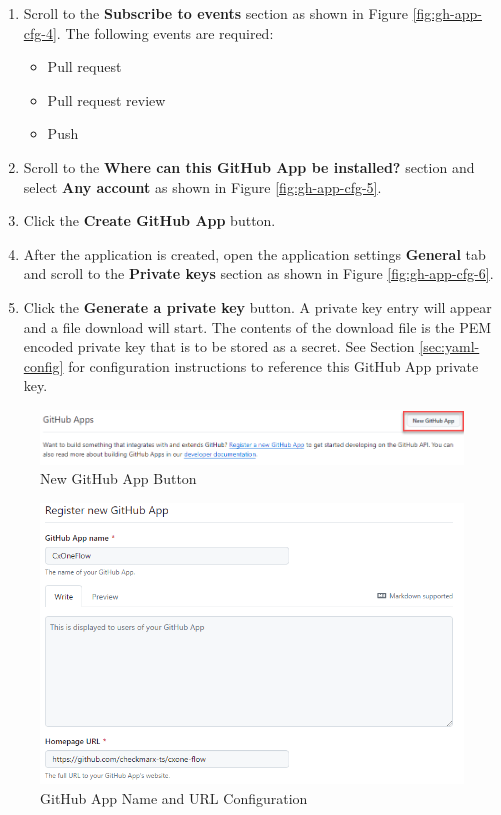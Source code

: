 \begin{enumerate}
\begin{itemize}
    \end{itemize}
    \item Scroll to the \textbf{Subscribe to events} section as shown in Figure \ref{fig:gh-app-cfg-4}.  The following events are required:
    \begin{itemize}
        \item Pull request
        \item Pull request review
        \item Push
    \end{itemize}
    \item Scroll to the \textbf{Where can this GitHub App be installed?} section and select \textbf{Any account} as shown in
    Figure \ref{fig:gh-app-cfg-5}.
    \item Click the \textbf{Create GitHub App} button.
    \item After the application is created, open the application settings \textbf{General} tab and scroll to the
    \textbf{Private keys} section as shown in Figure \ref{fig:gh-app-cfg-6}.
    \item Click the \textbf{Generate a private key} button.  A private key entry will appear and a file download will start.
    The contents of the download file is the PEM encoded private key that is to be stored as a secret.  See Section
    \ref{sec:yaml-config} for configuration instructions to reference this GitHub App private key.
\end{enumerate}

\begin{figure}[ht]
    \includegraphics[width=\textwidth]{graphics/gh-new-app.png}
    \caption{New GitHub App Button}
    \label{fig:gh-new-app}
\end{figure}


\begin{figure}[ht]
    \includegraphics[width=\textwidth]{graphics/gh-app-cfg-1.png}
    \caption{GitHub App Name and URL Configuration}
    \label{fig:gh-app-cfg-1}
\end{figure}

